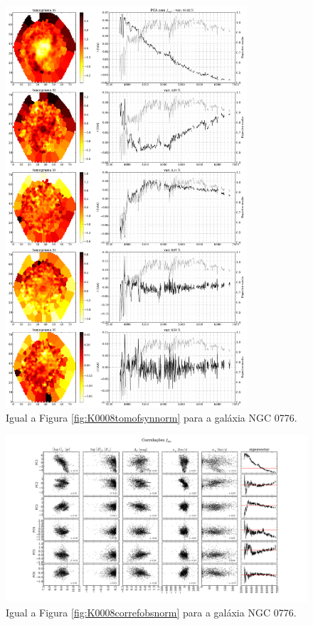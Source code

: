 \begin{figure}
    \includegraphics[width=0.8\textwidth]{figuras/K0073-tomo-syn-norm.pdf}
    \caption[Tomogramas de 1 a 5 para o cubo $f_{syn}$ - NGC 0776.]
    {Igual a Figura \ref{fig:K0008tomofsynnorm} para a galáxia NGC 0776.}
    \label{fig:K0073tomofsynnorm}
\end{figure}

\begin{figure}
    \includegraphics[width=1.2\textwidth, angle=-90]{figuras/K0073-correl-f_obs_norm-PCvsPhys.pdf}
	\caption[Correlações PCs vs. par\^ametros f\'isicos - $f_{obs}$ - NGC 0001]
	{Igual a Figura \ref{fig:K0008correfobsnorm} para a galáxia NGC 0776.}
    \label{fig:K0073correfobsnorm}
\end{figure}

